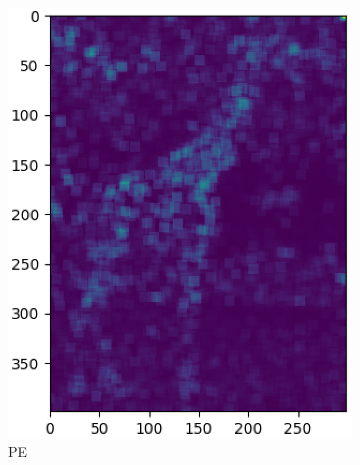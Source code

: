\documentclass{article}
\begin{document}
\begin{figure}[!h]
\begin{subfigure}{.2\textwidth}
    \includegraphics[width=\textwidth]{Bilder/MSE_Bilder/cropped/kernel10_positional_256_0.003_m0_G.eps}
    \caption{PE}
    \label{MSE256PE}
  \end{subfigure}\hfil
  \begin{subfigure}{.2\textwidth}

\end{subfigure}
\end{figure}
\end{document}
